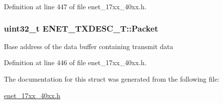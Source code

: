 Definition at line 447 of file enet\+\_\+17xx\+\_\+40xx.\+h.

\subsubsection[{\texorpdfstring{Packet}{Packet}}]{\setlength{\rightskip}{0pt plus 5cm}uint32\+\_\+t E\+N\+E\+T\+\_\+\+T\+X\+D\+E\+S\+C\+\_\+\+T\+::\+Packet}\hypertarget{structENET__TXDESC__T_aa32276326b2e5e4157e59d0f5553bae3}{}\label{structENET__TXDESC__T_aa32276326b2e5e4157e59d0f5553bae3}
Base address of the data buffer containing transmit data 

Definition at line 446 of file enet\+\_\+17xx\+\_\+40xx.\+h.



The documentation for this struct was generated from the following file\+:\begin{DoxyCompactItemize}
\item 
\hyperlink{enet__17xx__40xx_8h}{enet\+\_\+17xx\+\_\+40xx.\+h}\end{DoxyCompactItemize}

